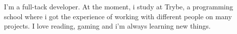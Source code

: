 

\begin{cvparagraph}


I'm a full-tack developer. At the moment, i study at Trybe, a programming school where
i got the experience of working with different people on many projects.
I love reading, gaming and i'm always learning new things.
\end{cvparagraph}
